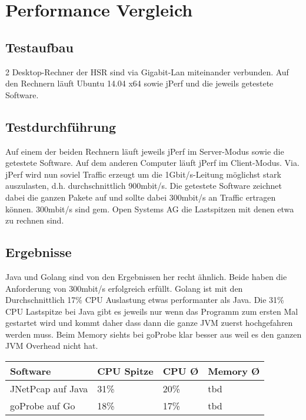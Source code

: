 \section{Performance Vergleich}
\label{sec:Performance Vergleich}

\subsection{Testaufbau}
2 Desktop-Rechner der HSR sind via Gigabit-Lan miteinander verbunden. Auf den Rechnern läuft Ubuntu 14.04 x64 sowie jPerf und die jeweils getestete Software.


\subsection{Testdurchführung}
Auf einem der beiden Rechnern läuft jeweils jPerf im Server-Modus sowie die getestete Software. Auf dem anderen Computer läuft jPerf im Client-Modus.
Via. jPerf wird nun soviel Traffic erzeugt um die 1Gbit/s-Leitung möglichst stark auszulasten, d.h. durchschnittlich 900mbit/s. Die getestete Software zeichnet dabei die ganzen Pakete auf und sollte dabei 300mbit/s an Traffic ertragen können. 300mbit/s sind gem. Open Systems AG die Lastspitzen mit denen etwa zu rechnen sind.

\subsection{Ergebnisse}
Java und Golang sind von den Ergebnissen her recht ähnlich. Beide haben die Anforderung von 300mbit/s erfolgreich erfüllt. Golang ist mit den Durchschnittlich 17\% CPU Auslastung etwas performanter als Java. Die 31\% CPU Lastspitze bei Java gibt es jeweils nur wenn das Programm zum ersten Mal gestartet wird und kommt daher dass dann die ganze \acs{JVM} zuerst hochgefahren werden muss.
Beim Memory siehts bei goProbe klar besser aus weil es den ganzen \acs{JVM} Overhead nicht hat.

\begin{table}[h]
\begin{tabular}{|l|l|l|l|}
\hline
\rowcolor[HTML]{C0C0C0} 
\textbf{Software} & \textbf{CPU Spitze} & \textbf{CPU Ø} & \textbf{Memory Ø} \\ \hline
JNetPcap auf Java & 31\%                & 20\%           & tbd               \\ \hline
goProbe auf Go    & 18\%                & 17\%           & tbd               \\ \hline
\end{tabular}
\end{table}